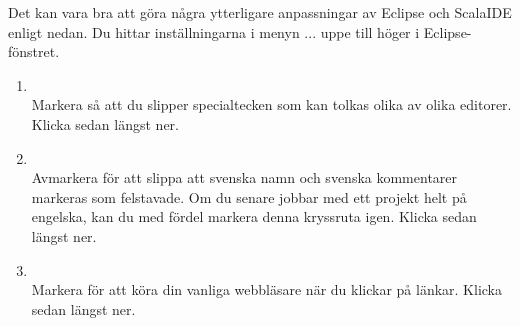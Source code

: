 Det kan vara bra att göra några ytterligare anpassningar av Eclipse och ScalaIDE enligt nedan. Du hittar inställningarna i menyn \EclipsePrefs ... uppe till höger i Eclipse-fönstret.

\begin{enumerate}


\item \EclipsePrefsGeneral{}
\\ Markera  så att du slipper specialtecken som kan tolkas olika av olika editorer. Klicka sedan  längst ner.

\item \EclipsePrefsGeneral{}
\\  Avmarkera  för att slippa att svenska namn och svenska kommentarer markeras som felstavade. Om du senare jobbar med ett projekt helt på engelska, kan du med fördel markera denna kryssruta igen. Klicka sedan  längst ner.

\item \EclipsePrefsGeneral{}
\\ Markera  för att köra din vanliga webbläsare när du klickar på länkar. Klicka sedan  längst ner.


\end{enumerate}
